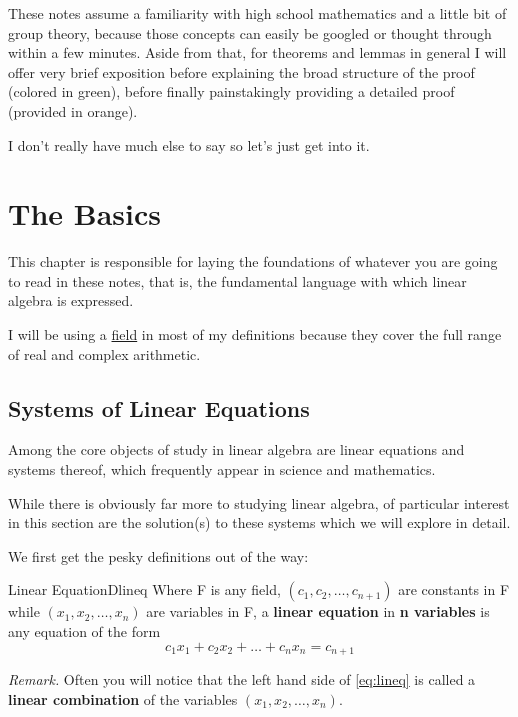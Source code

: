 \documentclass[oneside]{book}
\begin{document}
	These notes assume a familiarity with high school mathematics and a little bit of group theory, because those concepts can easily be googled or thought through within a few minutes. Aside from that, for theorems and lemmas in general I will offer very brief exposition before explaining the broad structure of the proof (colored in green), before finally painstakingly providing a detailed proof (provided in orange).
	
	I don't really have much else to say so let's just get into it.
	
	{
		\hypersetup{linkcolor=black}
		\tableofcontents
	}
	\chapter{The Basics}
	
	This chapter is responsible for laying the foundations of whatever you are going to read in these notes, that is, the fundamental language with which linear algebra is expressed. 
	
	I will be using a \href{https://simple.wikipedia.org/wiki/Field_(mathematics)}{field} in most of my definitions because they cover the full range of real and complex arithmetic.
	
	\section{Systems of Linear Equations}
	Among the core objects of study in linear algebra are linear equations and systems thereof, which frequently appear in science and mathematics.
	
	While there is obviously far more to studying linear algebra, of particular interest in this section are the solution(s) to these systems which we will explore in detail.
	
	We first get the pesky definitions out of the way:
	\begin{defn}{Linear Equation}{Dlineq}
		Where F is any field, $(c_1,c_2,\ldots,c_{n+1})$ are constants in F while $(x_1,x_2,\ldots,x_n)$ are variables in F, a \textbf{linear equation} in \textbf{n variables} is any equation of the form
		\begin{equation}
			\label{eq:lineq}
			c_1x_1+c_2x_2+\ldots+c_nx_n=c_{n+1}
		\end{equation}
	\end{defn}
	\textit{Remark.} Often you will notice that the left hand side of \ref{eq:lineq} is called a \textbf{linear combination} of the variables $(x_1,x_2,\ldots,x_n)$.
	
\end{document}
